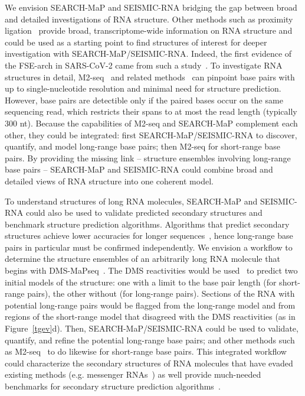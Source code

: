 \documentclass[main.tex]{subfiles}
\begin{document}
We envision SEARCH-MaP and SEISMIC-RNA bridging the gap between broad and detailed investigations of RNA structure.
Other methods such as proximity ligation~\cite{Aw2016,Lu2016,Sharma2016,Ziv2018,vanDamme2022} provide broad, transcriptome-wide information on RNA structure and could be used as a starting point to find structures of interest for deeper investigation with SEARCH-MaP/SEISMIC-RNA.
Indeed, the first evidence of the FSE-arch in SARS-CoV-2 came from such a study~\cite{Ziv2020}.
To investigate RNA structures in detail, M2-seq~\cite{Cheng2017} and related methods~\cite{Cordero2015} can pinpoint base pairs with up to single-nucleotide resolution and minimal need for structure prediction.
However, base pairs are detectible only if the paired bases occur on the same sequencing read, which restricts their spans to at most the read length (typically 300 nt).
Because the capabilities of M2-seq and SEARCH-MaP complement each other, they could be integrated: first SEARCH-MaP/SEISMIC-RNA to discover, quantify, and model long-range base pairs; then M2-seq for short-range base pairs.
By providing the missing link -- structure ensembles involving long-range base pairs -- SEARCH-MaP and SEISMIC-RNA could combine broad and detailed views of RNA structure into one coherent model.

To understand structures of long RNA molecules, SEARCH-MaP and SEISMIC-RNA could also be used to validate predicted secondary structures and benchmark structure prediction algorithms.
Algorithms that predict secondary structures achieve lower accuracies for longer sequences~\cite{Doshi2004,Nicholson2015}, hence long-range base pairs in particular must be confirmed independently.
We envision a workflow to determine the structure ensembles of an arbitrarily long RNA molecule that begins with DMS-MaPseq~\cite{Zubradt2016}.
The DMS reactivities would be used~\cite{Cordero2012} to predict two initial models of the structure: one with a limit to the base pair length (for short-range pairs), the other without (for long-range pairs).
Sections of the RNA with potential long-range pairs would be flagged from the long-range model and from regions of the short-range model that disagreed with the DMS reactivities (as in Figure~\ref{tgev}d).
Then, SEARCH-MaP/SEISMIC-RNA could be used to validate, quantify, and refine the potential long-range base pairs; and other methods such as M2-seq~\cite{Cheng2017} to do likewise for short-range base pairs.
This integrated workflow could characterize the secondary structures of RNA molecules that have evaded existing methods (e.g. messenger RNAs~\cite{Lange2012}) as well provide much-needed benchmarks for secondary structure prediction algorithms~\cite{Mathews2019}.
\end{document}
